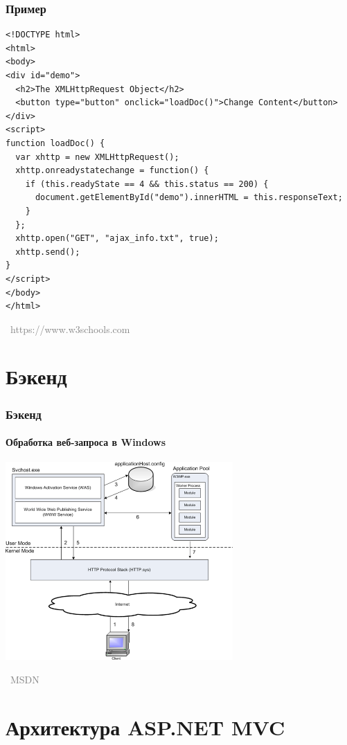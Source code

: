 \documentclass[xetex,mathserif,serif]{beamer}
\newcommand{\attribution}[1] {
\vspace{-5mm}\begin{flushright}\begin{scriptsize}\textcolor{gray}{\textcopyright\, #1}\end{scriptsize}\end{flushright}
}
\begin{document}
	\begin{frame}[fragile]
		\frametitle{Пример}
		\begin{scriptsize}
			\begin{verbatim}
<!DOCTYPE html>
<html>
<body>
<div id="demo">
  <h2>The XMLHttpRequest Object</h2>
  <button type="button" onclick="loadDoc()">Change Content</button>
</div>
<script>
function loadDoc() {
  var xhttp = new XMLHttpRequest();
  xhttp.onreadystatechange = function() {
    if (this.readyState == 4 && this.status == 200) {
      document.getElementById("demo").innerHTML = this.responseText;
    }
  };
  xhttp.open("GET", "ajax_info.txt", true);
  xhttp.send();
}
</script>
</body>
</html>
			\end{verbatim}
		\end{scriptsize}
		\vspace{-3mm}
		\attribution{https://www.w3schools.com}
	\end{frame}

	\section{Бэкенд}

	\begin{frame}
		\frametitle{Бэкенд}
		\framesubtitle{Обработка веб-запроса в Windows}
		\begin{center}
			\includegraphics[width=0.65\textwidth]{requestProcessing.png}
			\vspace{-5mm}
			\attribution{MSDN}
		\end{center}
	\end{frame}

	\section{Архитектура ASP.NET MVC}
\end{document}
